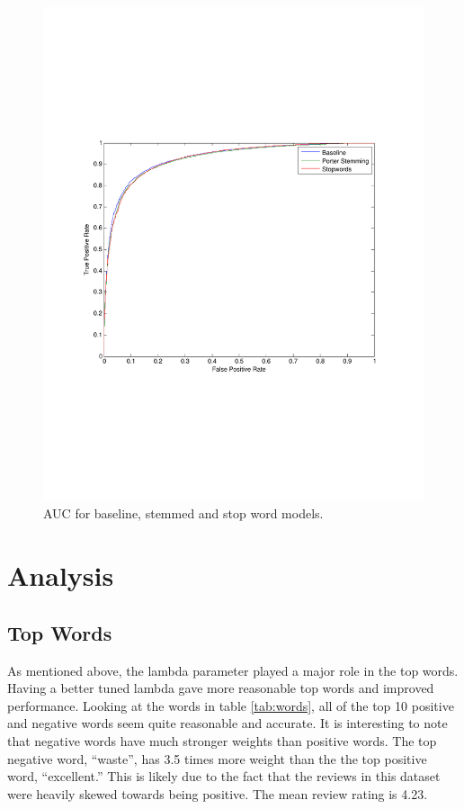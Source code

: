 \documentclass{article}
\begin{document}
\begin{figure}[h]
	\centering
	\includegraphics[width=\linewidth]{files/aucs.pdf}
	\caption{AUC for baseline, stemmed and stop word models.}
	\label{fig:auc}
\end{figure}

\section{Analysis}
\subsection{Top Words}
As mentioned above, the lambda parameter played a major role in the top words. Having a better tuned lambda gave more reasonable top words and improved performance. Looking at the words in table \ref{tab:words}, all of the top 10 positive and negative words seem quite reasonable and accurate. It is interesting to note that negative words have much stronger weights than positive words. The top negative word, ``waste'', has 3.5 times more weight than the the top positive word, ``excellent.'' This is likely due to the fact that the reviews in this dataset were heavily skewed towards being positive. The mean review rating is 4.23. 
\end{document}

